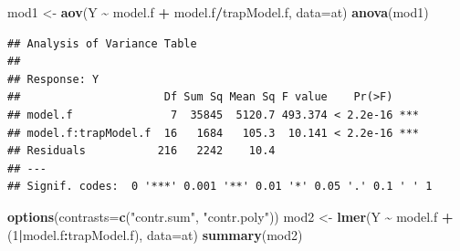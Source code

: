 \documentclass[
]{book}
\newenvironment{Shaded}{\begin{snugshade}}{\end{snugshade}}
\newcommand{\AttributeTok}[1]{\textcolor[rgb]{0.13,0.29,0.53}{#1}}
\newcommand{\DecValTok}[1]{\textcolor[rgb]{0.00,0.00,0.81}{#1}}
\newcommand{\FunctionTok}[1]{\textcolor[rgb]{0.13,0.29,0.53}{\textbf{#1}}}
\newcommand{\NormalTok}[1]{#1}
\newcommand{\OtherTok}[1]{\textcolor[rgb]{0.56,0.35,0.01}{#1}}
\newcommand{\SpecialCharTok}[1]{\textcolor[rgb]{0.81,0.36,0.00}{\textbf{#1}}}
\newcommand{\StringTok}[1]{\textcolor[rgb]{0.31,0.60,0.02}{#1}}
\begin{document}
\begin{Shaded}
\begin{Highlighting}[]
\NormalTok{mod1 }\OtherTok{\textless{}{-}} \FunctionTok{aov}\NormalTok{(Y }\SpecialCharTok{\textasciitilde{}}\NormalTok{ model.f }\SpecialCharTok{+}\NormalTok{ model.f}\SpecialCharTok{/}\NormalTok{trapModel.f, }\AttributeTok{data=}\NormalTok{at)}
\FunctionTok{anova}\NormalTok{(mod1)}
\end{Highlighting}
\end{Shaded}

\begin{verbatim}
## Analysis of Variance Table
## 
## Response: Y
##                      Df Sum Sq Mean Sq F value    Pr(>F)    
## model.f               7  35845  5120.7 493.374 < 2.2e-16 ***
## model.f:trapModel.f  16   1684   105.3  10.141 < 2.2e-16 ***
## Residuals           216   2242    10.4                      
## ---
## Signif. codes:  0 '***' 0.001 '**' 0.01 '*' 0.05 '.' 0.1 ' ' 1
\end{verbatim}

\begin{Shaded}
\begin{Highlighting}[]
\FunctionTok{options}\NormalTok{(}\AttributeTok{contrasts=}\FunctionTok{c}\NormalTok{(}\StringTok{"contr.sum"}\NormalTok{, }\StringTok{"contr.poly"}\NormalTok{))}
\NormalTok{mod2 }\OtherTok{\textless{}{-}} \FunctionTok{lmer}\NormalTok{(Y }\SpecialCharTok{\textasciitilde{}}\NormalTok{ model.f }\SpecialCharTok{+}\NormalTok{ (}\DecValTok{1}\SpecialCharTok{|}\NormalTok{model.f}\SpecialCharTok{:}\NormalTok{trapModel.f), }\AttributeTok{data=}\NormalTok{at)}
\FunctionTok{summary}\NormalTok{(mod2)}
\end{Highlighting}
\end{Shaded}
\end{document}
